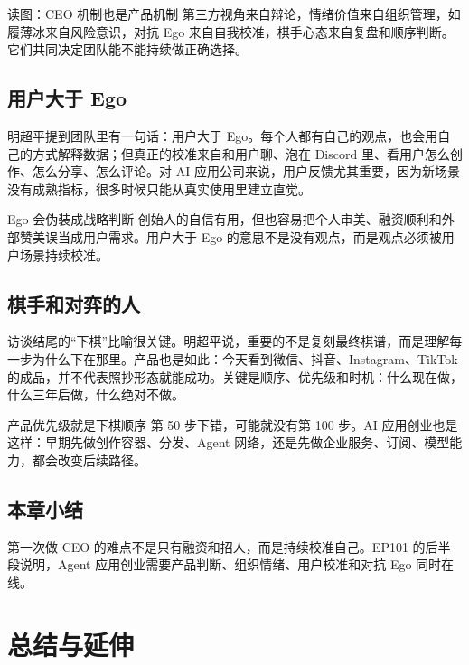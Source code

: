 \documentclass[a4paper]{article}
\begin{document}
\begin{knowledgebox}{读图：CEO 机制也是产品机制}
第三方视角来自辩论，情绪价值来自组织管理，如履薄冰来自风险意识，对抗 Ego 来自自我校准，棋手心态来自复盘和顺序判断。它们共同决定团队能不能持续做正确选择。
\end{knowledgebox}

\subsection{用户大于 Ego}

明超平提到团队里有一句话：用户大于 Ego。每个人都有自己的观点，也会用自己的方式解释数据；但真正的校准来自和用户聊、泡在 Discord 里、看用户怎么创作、怎么分享、怎么评论。对 AI 应用公司来说，用户反馈尤其重要，因为新场景没有成熟指标，很多时候只能从真实使用里建立直觉。

\begin{warningbox}{Ego 会伪装成战略判断}
创始人的自信有用，但也容易把个人审美、融资顺利和外部赞美误当成用户需求。用户大于 Ego 的意思不是没有观点，而是观点必须被用户场景持续校准。
\end{warningbox}

\subsection{棋手和对弈的人}

访谈结尾的“下棋”比喻很关键。明超平说，重要的不是复刻最终棋谱，而是理解每一步为什么下在那里。产品也是如此：今天看到微信、抖音、Instagram、TikTok 的成品，并不代表照抄形态就能成功。关键是顺序、优先级和时机：什么现在做，什么三年后做，什么绝对不做。

\begin{importantbox}{产品优先级就是下棋顺序}
第 50 步下错，可能就没有第 100 步。AI 应用创业也是这样：早期先做创作容器、分发、Agent 网络，还是先做企业服务、订阅、模型能力，都会改变后续路径。
\end{importantbox}

\subsection{本章小结}

第一次做 CEO 的难点不是只有融资和招人，而是持续校准自己。EP101 的后半段说明，Agent 应用创业需要产品判断、组织情绪、用户校准和对抗 Ego 同时在线。

\section{总结与延伸}
\end{document}
